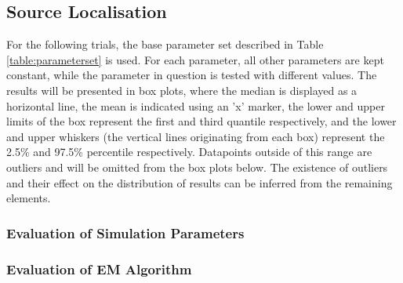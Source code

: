\subsection{Source Localisation}
For the following trials, the base parameter set described in Table \ref{table:parameterset} is used. For each parameter, all other parameters are kept constant, while the parameter in question is tested with different values. The results will be presented in box plots, where the median is displayed as a horizontal line, the mean is indicated using an 'x' marker, the lower and upper limits of the box represent the first and third quantile respectively, and the lower and upper whiskers (the vertical lines originating from each box) represent the 2.5\% and 97.5\% percentile respectively. Datapoints outside of this range are outliers and will be omitted from the box plots below. The existence of outliers and their effect on the distribution of results can be inferred from the remaining elements.

\subsubsection{Evaluation of Simulation Parameters}










\subsubsection{Evaluation of EM Algorithm}

